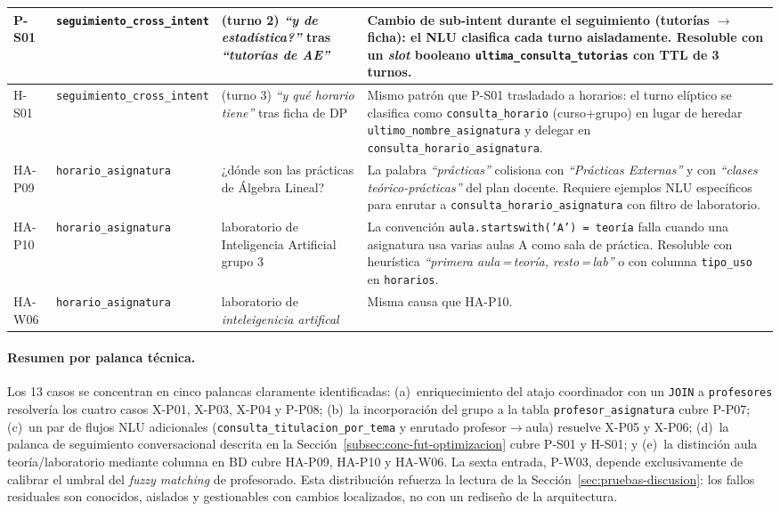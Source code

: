{\begin{longtable}{|>{\raggedright\arraybackslash}p{1.1cm}|>{\raggedright\arraybackslash}p{2.7cm}|>{\raggedright\arraybackslash}p{4.2cm}|>{\raggedright\arraybackslash}p{5.0cm}|}
P-S01 & \texttt{seguimiento\_\allowbreak cross\_intent} & (turno 2) \textit{``y de estadística?''} tras \textit{``tutorías de AE''} & Cambio de sub-intent durante el seguimiento (tutorías $\rightarrow$ ficha): el NLU clasifica cada turno aisladamente. Resoluble con un \textit{slot} booleano \texttt{ultima\_consulta\_tutorias} con TTL de 3 turnos. \\ \hline
H-S01 & \texttt{seguimiento\_\allowbreak cross\_intent} & (turno 3) \textit{``y qué horario tiene''} tras ficha de DP & Mismo patrón que P-S01 trasladado a horarios: el turno elíptico se clasifica como \texttt{consulta\_horario} (curso+grupo) en lugar de heredar \texttt{ultimo\_nombre\_asignatura} y delegar en \texttt{consulta\_horario\_asignatura}. \\ \hline
HA-P09 & \texttt{horario\_\allowbreak asignatura} & ¿dónde son las prácticas de Álgebra Lineal? & La palabra \textit{``prácticas''} colisiona con \textit{``Prácticas Externas''} y con \textit{``clases teórico-prácticas''} del plan docente. Requiere ejemplos NLU específicos para enrutar a \texttt{consulta\_horario\_asignatura} con filtro de laboratorio. \\ \hline
HA-P10 & \texttt{horario\_\allowbreak asignatura} & laboratorio de Inteligencia Artificial grupo 3 & La convención \texttt{aula.startswith('A')\,=\,teoría} falla cuando una asignatura usa varias aulas A como sala de práctica. Resoluble con heurística \textit{``primera aula\,=\,teoría, resto\,=\,lab''} o con columna \texttt{tipo\_uso} en \texttt{horarios}. \\ \hline
HA-W06 & \texttt{horario\_\allowbreak asignatura} & laboratorio de \textit{inteleigenicia artifical} & Misma causa que HA-P10. \\ \hline
\end{longtable}
}

\paragraph{Resumen por palanca técnica.} Los 13 casos se concentran en cinco palancas claramente identificadas: (a)~enriquecimiento del atajo coordinador con un \texttt{JOIN} a \texttt{profesores} resolvería los cuatro casos X-P01, X-P03, X-P04 y P-P08; (b)~la incorporación del grupo a la tabla \texttt{profesor\_asignatura} cubre P-P07; (c)~un par de flujos NLU adicionales (\texttt{consulta\_titulacion\_por\_tema} y enrutado profesor$\rightarrow$aula) resuelve X-P05 y X-P06; (d)~la palanca de seguimiento conversacional descrita en la Sección~\ref{subsec:conc-fut-optimizacion} cubre P-S01 y H-S01; y (e)~la distinción aula teoría/laboratorio mediante columna en BD cubre HA-P09, HA-P10 y HA-W06. La sexta entrada, P-W03, depende exclusivamente de calibrar el umbral del \textit{fuzzy matching} de profesorado. Esta distribución refuerza la lectura de la Sección~\ref{sec:pruebas-discusion}: los fallos residuales son conocidos, aislados y gestionables con cambios localizados, no con un rediseño de la arquitectura.
